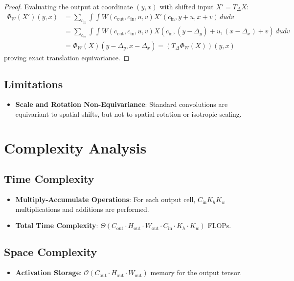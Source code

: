 \documentclass[11pt,a4paper]{article}
\theoremstyle{definition}
\begin{document}
\begin{proof}
Evaluating the output at coordinate $(y, x)$ with shifted input $X' = T_\Delta X$:
\begin{align}
\Phi_W(X')(y, x) &= \sum_{c_{\text{in}}} \int \int W(c_{\text{out}}, c_{\text{in}}, u, v) X'(c_{\text{in}}, y + u, x + v) \, du dv \\
&= \sum_{c_{\text{in}}} \int \int W(c_{\text{out}}, c_{\text{in}}, u, v) X(c_{\text{in}}, (y - \Delta_y) + u, (x - \Delta_x) + v) \, du dv \\
&= \Phi_W(X)(y - \Delta_y, x - \Delta_x) = (T_\Delta \Phi_W(X))(y, x)
\end{align}
proving exact translation equivariance.
\end{proof}

\subsection{Limitations}
\begin{itemize}
    \item \textbf{Scale and Rotation Non-Equivariance}: Standard convolutions are equivariant to spatial shifts, but not to spatial rotation or isotropic scaling.
\end{itemize}

\section{Complexity Analysis}

\subsection{Time Complexity}
\begin{itemize}
    \item \textbf{Multiply-Accumulate Operations}: For each output cell, $C_{\text{in}} K_h K_w$ multiplications and additions are performed.
    \item \textbf{Total Time Complexity}: $\Theta(C_{\text{out}} \cdot H_{\text{out}} \cdot W_{\text{out}} \cdot C_{\text{in}} \cdot K_h \cdot K_w)$ FLOPs.
\end{itemize}

\subsection{Space Complexity}
\begin{itemize}
    \item \textbf{Activation Storage}: $\mathcal{O}(C_{\text{out}} \cdot H_{\text{out}} \cdot W_{\text{out}})$ memory for the output tensor.
\end{itemize}
\end{document}
